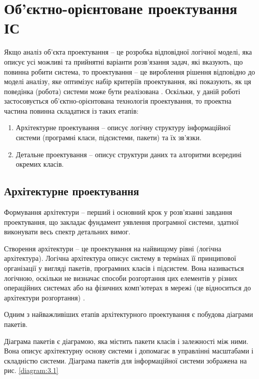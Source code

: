 \documentclass[../main.tex]{subfiles}
\begin{document}
\chapter{Об’єктно-орієнтоване проектування ІС}

Якщо аналіз об’єкта проектування – це розробка відповідної логічної моделі, яка описує усі можливі та прийнятні варіанти розв’язання задач, які вказують, що повинна робити система, то проектування – це вироблення рішення відповідно до моделі аналізу, яке оптимізує набір критеріїв проектування, які  показують, як ця поведінка (робота) системи може бути реалізована \cite{diploma_guidelines}.
Оскільки, у даній роботі застосовується об’єктно-орієнтована технологія проектування, то проектна частина повинна складатися із таких етапів:

\begin{enumerate}
	\item Архітектурне проектування – описує логічну структуру інформаційної системи (програмні класи, підсистеми,  пакети) та їх зв’язки.
	\item Детальне проектування – описує структури даних та алгоритми всередині окремих класів. 
\end{enumerate}

\section{Архітектурне проектування}
Формування архітектури – перший і основний крок у розв’язанні завдання проектування, що закладає фундамент уявлення програмної системи, здатної виконувати весь спектр детальних вимог. \cite{diploma_guidelines2}

Створення архітектури – це проектування на найвищому рівні (логічна архітектура). Логічна архітектура описує систему в термінах її принципової організації у вигляді пакетів, програмних класів і підсистем. Вона називається логічною, оскільки не визначає способи розгортання цих елементів у різних операційних системах або на фізичних комп’ютерах в мережі (це відноситься до архітектури розгортання) \cite{diploma_guidelines}.

Одним з найважливіших етапів архітектурного проектування є побудова діаграми пакетів. 

Діаграма пакетів є діаграмою, яка містить пакети класів і залежності між ними. Вона описує архітектурну основу системи і допомагає в управлінні масштабами і складністю системи. Діаграма пакетів для інформаційної системи зображена на рис. \ref{diagram:3.1}
\vspace{\baselineskip}
\end{document}

